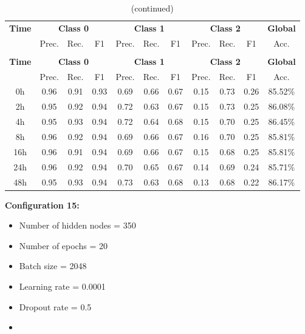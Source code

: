 \documentclass[12pt,oneside]{book} %
\begin{document}
\setlength\LTleft{1cm}
\begin{longtable}{ c ccc ccc ccc c}
\caption{Performance metrics of the LNN model for configuration 14} \\
\toprule
\textbf{Time} & \multicolumn{3}{c}{\textbf{Class 0}} & \multicolumn{3}{c}{\textbf{Class 1}} & \multicolumn{3}{c}{\textbf{Class 2}} & \textbf{Global} \\
               & Prec. & Rec. & F1  & Prec. & Rec. & F1   & Prec. & Rec. & F1  & Acc. \\
\midrule
\endfirsthead

\caption[]{(continued)} \\
\toprule
\textbf{Time} & \multicolumn{3}{c}{\textbf{Class 0}} & \multicolumn{3}{c}{\textbf{Class 1}} & \multicolumn{3}{c}{\textbf{Class 2}} & \textbf{Global} \\
               & Prec. & Rec. & F1  & Prec. & Rec. & F1   & Prec. & Rec. & F1  & Acc. \\
\midrule
\endhead

\bottomrule
\endfoot

\bottomrule
\endlastfoot

0h   & 0.96  & 0.91 & 0.93 & 0.69  & 0.66 & 0.67  & 0.15  & 0.73 & 0.26 & 85.52\% \\
2h   & 0.95  & 0.92 & 0.94 & 0.72  & 0.63 & 0.67  & 0.15  & 0.73 & 0.25 & 86.08\% \\
4h   & 0.95  & 0.93 & 0.94 & 0.72  & 0.64 & 0.68  & 0.15  & 0.70 & 0.25 & 86.45\% \\
8h   & 0.96  & 0.92 & 0.94 & 0.69  & 0.66 & 0.67  & 0.16  & 0.70 & 0.25 & 85.81\% \\
16h  & 0.96  & 0.91 & 0.94 & 0.69  & 0.66 & 0.67  & 0.15  & 0.68 & 0.25 & 85.81\% \\
24h  & 0.96  & 0.92 & 0.94 & 0.70  & 0.65 & 0.67  & 0.14  & 0.69 & 0.24 & 85.71\% \\
48h  & 0.95  & 0.93 & 0.94 & 0.73  & 0.63 & 0.68  & 0.13  & 0.68 & 0.22 & 86.17\% \\
\end{longtable}

\noindent \textbf{Configuration 15:}
\begin{multicols}{2}
    \begin{itemize}
        \item Number of hidden nodes = 350
        \item Number of epochs = 20
        \item Batch size = 2048
    \end{itemize}
    \begin{itemize}
         \item Learning rate = 0.0001
         \item Dropout rate  = 0.5
         \item[\hspace{0pt}]
    \end{itemize}
\end{multicols}
\end{document}
